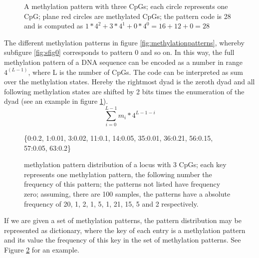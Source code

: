 \begin{figure}[h]
\centering
{}
\caption{A methylation pattern with three CpGs; each circle represents one CpG; plane red circles are methylated CpGs; the pattern code is 28 and is computed as $1*4^2 + 3*4^1 + 0*4^0 = 16 + 12 + 0 = 28$}
\label{fig:mexample}
\end{figure}

The different methylation patterns in figure \ref{fig:methylationpatterns}, whereby subfigure \ref{fig:sfig0} corresponds to pattern 0 and so on.\newline
In this way, the full methylation pattern of a DNA sequence can be encoded as a number in range $4^(L-1)$, where L is the number of \acp{CpG}. The code can be interpreted as sum over the methylation states. Hereby the rightmost dyad is the zeroth dyad and all following methylation states are shifted by 2 bits times the enumeration of the dyad (see an example in figure \ref{fig:mexample}).
\[\sum^{L-1}_{i=0}{m_i * 4^{L-1-i}}\]
\begin{figure}
\{0:0.2, 1:0.01, 3:0.02, 11:0.1, 14:0.05, 35:0.01, 36:0.21, 56:0.15, 57:0.05, 63:0.2\}
\label{dict}
\caption{methylation pattern distribution of a locus with 3 CpGs; each key represents one methylation pattern, the following number the frequency of this pattern; the patterns not listed have frequency zero; assuming, there are 100 samples, the patterns have a absolute frequency of 20, 1, 2, 1, 5, 1, 21, 15, 5 and 2 respectively.}
\end{figure}
If we are given a set of methylation patterns, the pattern distribution may be represented as dictionary, where the key of each entry is a methylation pattern and its value the frequency of this key in the set of methylation patterns. See Figure \ref{dict} for an example.\\

